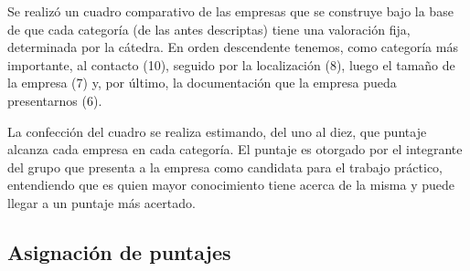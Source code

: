 \documentclass[a4paper,10pt]{article}
\begin{document}
Se realizó un cuadro comparativo de las empresas que se construye bajo la base de que cada categoría (de las antes descriptas) tiene una valoración fija, determinada por la cátedra. En orden descendente tenemos, como categoría más importante, al contacto (10), seguido por la localización (8), luego el tamaño de la empresa (7) y, por último, la documentación que la empresa pueda presentarnos (6).

La confección del cuadro se realiza estimando, del uno al diez, que puntaje alcanza cada empresa en cada categoría. El puntaje es otorgado por el integrante del grupo que presenta a la empresa como candidata para el trabajo práctico, entendiendo que es quien mayor conocimiento tiene acerca de la misma y puede llegar a un puntaje más acertado.

\subsection{Asignación de puntajes}
\end{document}

